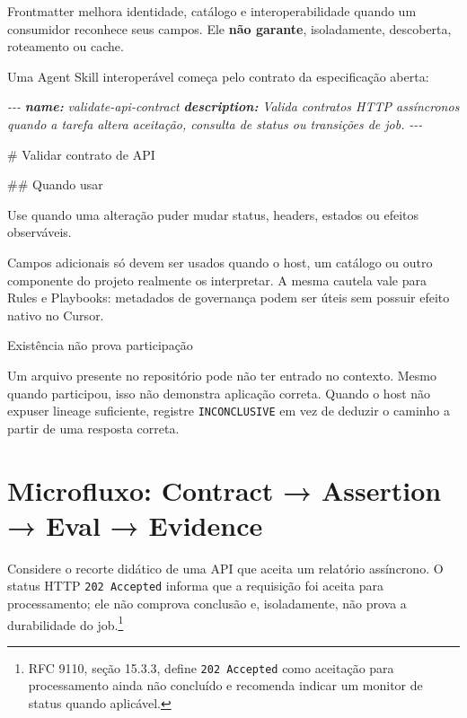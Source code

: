 \documentclass[
  10pt,
  a4paper,
  oneside]{book}
\newenvironment{Shaded}{}{}
\newcommand{\AnnotationTok}[1]{\textcolor[rgb]{0.38,0.63,0.69}{\textbf{\textit{#1}}}}
\newcommand{\CommentTok}[1]{\textcolor[rgb]{0.38,0.63,0.69}{\textit{#1}}}
\newcommand{\FunctionTok}[1]{\textcolor[rgb]{0.02,0.16,0.49}{#1}}
\newcommand{\NormalTok}[1]{#1}
\renewenvironment{Shaded}{\begin{snugshade}}{\end{snugshade}}%
\begin{document}
Frontmatter melhora identidade, catálogo e interoperabilidade quando um
consumidor reconhece seus campos. Ele \textbf{não garante},
isoladamente, descoberta, roteamento ou cache.

Uma Agent Skill interoperável começa pelo contrato da especificação
aberta:

\begin{Shaded}
\begin{Highlighting}[]
\CommentTok{{-}{-}{-}}
\AnnotationTok{name:}\CommentTok{ validate{-}api{-}contract}
\AnnotationTok{description:}\CommentTok{ Valida contratos HTTP assíncronos quando a tarefa altera aceitação, consulta de status ou transições de job.}
\CommentTok{{-}{-}{-}}

\FunctionTok{\# Validar contrato de API}

\FunctionTok{\#\# Quando usar}

\NormalTok{Use quando uma alteração puder mudar status, headers, estados ou efeitos observáveis.}
\end{Highlighting}
\end{Shaded}

Campos adicionais só devem ser usados quando o host, um catálogo ou
outro componente do projeto realmente os interpretar. A mesma cautela
vale para Rules e Playbooks: metadados de governança podem ser úteis sem
possuir efeito nativo no Cursor.

\begin{warningbox}{Existência não prova participação}

Um arquivo presente no repositório pode não ter entrado no contexto.
Mesmo quando participou, isso não demonstra aplicação correta. Quando o
host não expuser lineage suficiente, registre \texttt{INCONCLUSIVE} em
vez de deduzir o caminho a partir de uma resposta correta.

\end{warningbox}

\hypertarget{microfluxo-contract-assertion-eval-evidence}{%
\section{Microfluxo: Contract → Assertion → Eval →
Evidence}\label{microfluxo-contract-assertion-eval-evidence}}

Considere o recorte didático de uma API que aceita um relatório
assíncrono. O status HTTP \texttt{202\ Accepted} informa que a
requisição foi aceita para processamento; ele não comprova conclusão e,
isoladamente, não prova a durabilidade do job.\footnote{RFC 9110, seção
  15.3.3, define \texttt{202\ Accepted} como aceitação para
  processamento ainda não concluído e recomenda indicar um monitor de
  status quando aplicável.}
\end{document}
